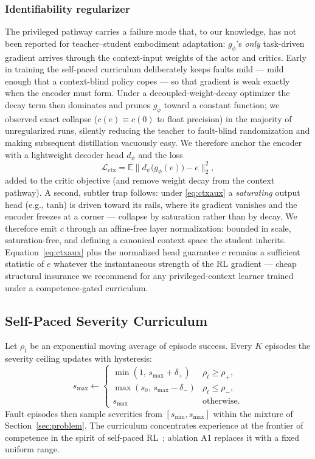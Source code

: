\documentclass[journal]{IEEEtran}
\newcommand{\E}{\mathbb{E}}
\begin{document}
\subsubsection*{Identifiability regularizer}
The privileged pathway carries a failure mode that, to our knowledge, has
not been reported for teacher--student embodiment adaptation: $g_\phi$'s
\emph{only} task-driven gradient arrives through the context-input weights
of the actor and critics. Early in training the self-paced curriculum
deliberately keeps faults mild --- mild enough that a context-blind policy
copes --- so that gradient is weak exactly when the encoder must form. Under
a decoupled-weight-decay optimizer the decay term then dominates and prunes
$g_\phi$ toward a constant function; we observed exact collapse
($c(e) \equiv c(0)$ to float precision) in the majority of unregularized
runs, silently reducing the teacher to fault-blind randomization and making
subsequent distillation vacuously easy. We therefore anchor the encoder with
a lightweight decoder head $d_\psi$ and the loss
\begin{equation}
\mathcal{L}_{\mathrm{ctx}} = \E\big\lVert d_\psi\big(g_\phi(e)\big) - e
\big\rVert_2^2 ,
\label{eq:ctxaux}
\end{equation}
added to the critic objective (and remove weight decay from the context
pathway). A second, subtler trap follows: under \eqref{eq:ctxaux} a
\emph{saturating} output head (e.g., tanh) is driven toward its rails, where
its gradient vanishes and the encoder freezes at a corner --- collapse by
saturation rather than by decay. We therefore emit $c$ through an
affine-free layer normalization: bounded in scale, saturation-free, and
defining a canonical context space the student inherits.
Equation~\eqref{eq:ctxaux} plus the normalized head guarantee $c$ remains a
sufficient statistic of $e$ whatever the instantaneous strength of the RL
gradient --- cheap structural insurance we recommend for any
privileged-context learner trained under a competence-gated curriculum.

\subsection{Self-Paced Severity Curriculum}\label{sec:curriculum}
Let $\rho_t$ be an exponential moving average of episode success. Every $K$
episodes the severity ceiling updates with hysteresis:
\begin{equation}
s_{\max} \leftarrow
\begin{cases}
\min(1,\, s_{\max} + \delta_+) & \rho_t \ge \rho_+ ,\\
\max(s_0,\, s_{\max} - \delta_-) & \rho_t \le \rho_- ,\\
s_{\max} & \text{otherwise.}
\end{cases}
\label{eq:curriculum}
\end{equation}
Fault episodes then sample severities from $[s_{\mathrm{min}}, s_{\max}]$
within the mixture of Section~\ref{sec:problem}. The curriculum concentrates
experience at the frontier of competence in the spirit of self-paced
RL~\cite{Klink2022SPDL,Portelas2020ALPGMM}; ablation A1 replaces it with a
fixed uniform range.
\end{document}
